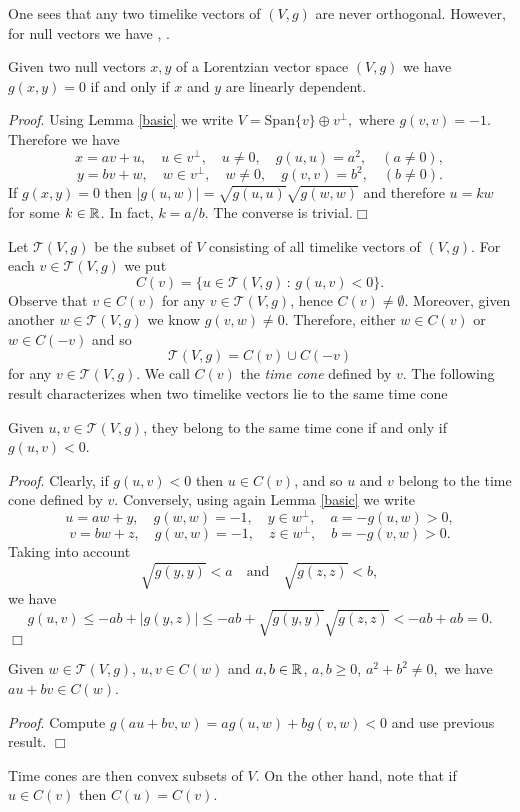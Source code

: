 One sees that any two timelike vectors of $(V,g)$ are never orthogonal.
However, for null vectors we have  \cite[Cor. 1.1.5]{sachs77}, \cite[p. 155]{oneill83}.

\begin{pro} Given two null vectors $x,y$ of a Lorentzian vector space $(V,g)$ we have
$g(x,y)=0$ if and only if $x$ and $y$ are linearly dependent.
\end{pro}
\emph{Proof}. Using Lemma \ref{basic} we write $V=\mathrm{Span}\{v\}\oplus v^{\perp},$ where $g(v,v)=-1$. Therefore we
have
\[
x=av+u, \quad u\in v^{\perp}, \quad u\neq 0, \quad g(u,u)=a^2, \quad (a\neq 0),
\]
\[
y=bv+w, \quad w\in v^{\perp}, \quad w\neq 0, \quad g(v,v)=b^2, \quad (b\neq 0).
\]
If $g(x,y)=0$ then $\mid g(u,w)\mid = \sqrt{g(u,u)}\sqrt{g(w,w)}$ and therefore $u=kw$ for some $k\in \mathbb{R}$. In fact, $k=a/b$.
The converse is trivial.\hfill{$\Box$}

\vspace{2mm}

Let $\mathcal{T}(V,g)$ be the subset of $V$ consisting of all timelike vectors of $(V,g)$. For each $v\in \mathcal{T}(V,g)$ we put
\[
C(v)=\{u\in\mathcal{T}(V,g)\, : \, g(u,v)<0 \}.
\]
Observe that $v\in C(v)$ for any $v\in \mathcal{T}(V,g)$, hence $C(v)\neq \emptyset$. Moreover, given another $w\in \mathcal{T}(V,g)$
we know $g(v,w)\neq 0$. Therefore, either $w\in C(v)$ or $w\in C(-v)$ and so
\[
\mathcal{T}(V,g)=C(v) \cup C(-v)
\]
for any $v\in \mathcal{T}(V,g)$. We call $C(v)$ the \emph{time cone} defined by $v$. The following result characterizes
when two timelike vectors lie to the same time cone \cite[Lemma 5.29]{oneill83}

\begin{lem}\label{time_cone}
Given $u,v\in \mathcal{T}(V,g)$, they belong to the same time cone if and only if $g(u,v)<0$.
\end{lem}

\noindent \emph{Proof}. Clearly, if $g(u,v)<0$ then $u\in C(v)$, and so $u$ and $v$ belong to the time cone
defined by $v$. Conversely, using again Lemma \ref{basic} we write
\[
u=aw+y, \quad g(w,w)=-1, \quad y\in w^{\perp}, \quad a=-g(u,w)>0,
\]
\[
v=bw+z, \quad g(w,w)=-1, \quad z\in w^{\perp}, \quad b=-g(v,w)>0.
\]
Taking into account
\[
\sqrt{g(y,y)}<a \quad \mathrm{and} \quad \sqrt{g(z,z)}<b,
\]
we have
\[
g(u,v)\leq -ab+\mid g(y,z)\mid \leq -ab + \sqrt{g(y,y)}\sqrt{g(z,z)}<-ab+ab=0.
\]
\hfill{$\Box$}
\begin{cor}\label{convexity}
Given $w\in\mathcal{T}(V,g)$, $u,v\in C(w)$ and $a,b\in \mathbb{R}$, $a,b\geq 0$, $a^2+b^2 \neq 0,$ we have $au+bv\in C(w)$.
\end{cor}
\noindent \emph{Proof}. Compute $g(au+bv,w)=a g(u,w)+ b g(v,w)<0$ and use previous result. \hfill{$\Box$}
\begin{rem}{\rm
Time cones are then convex subsets of $V$. On the other hand, note that if $u\in C(v)$ then $C(u)=C(v)$.}
\end{rem}

